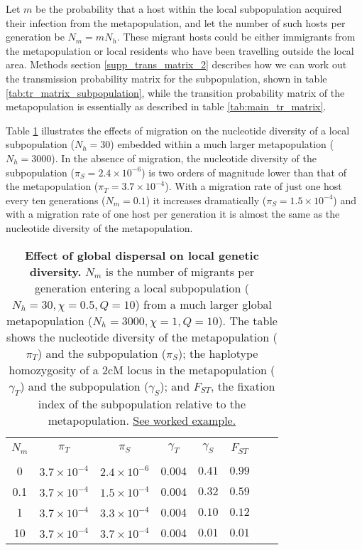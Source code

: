 \documentclass[_main.tex]{subfiles}
\begin{document}
Let $m$ be the probability that a host within the local subpopulation acquired their infection from the metapopulation, and let the number of such hosts per generation be $N_m = m N_h$.  These migrant hosts could be either immigrants from the metapopulation or local residents who have been travelling outside the local area.  Methods section \ref{supp_trans_matrix_2} describes how we can work out the transmission probability matrix for the subpopulation, shown in table \ref{tab:tr_matrix_subpopulation}, while the transition probability matrix of the metapopulation is essentially as described in table \ref{tab:main_tr_matrix}.   

Table \ref{table:main_global_dispersal_1} illustrates the effects of migration on the nucleotide diversity of a local subpopulation ($N_h = 30$) embedded within a much larger metapopulation ($N_h = 3000$).   In the absence of migration, the nucleotide diversity of the subpopulation ($\pi_S = 2.4 \times 10^{-6}$) is two orders of magnitude lower than that of the metapopulation ($\pi_T = 3.7 \times 10^{-4}$).   With a migration rate of just one host every ten generations ($N_m = 0.1$) it increases dramatically ($\pi_S = 1.5 \times 10^{-4}$) and with a migration rate of one host per generation it is almost the same as the nucleotide diversity of the metapopulation.  

 \begin{table}[h!] 
\centering
\small{
\begin{tabular}{c c c c c c c c} 
\hline \\
$N_m$ & $\pi_T$ & $\pi_S$ & $\gamma_T$ & $\gamma_S$ & $F_{ST}$ \\ [0.5ex] 
\hline \\
0 & $3.7 \times 10^{-4} $ & $2.4 \times 10^{-6}$ & 0.004 & $0.41$ & $0.99$ \\ [2ex]
0.1 & $3.7 \times 10^{-4} $ &  $1.5 \times 10^{-4}$ & 0.004 & $0.32$ & $0.59$ \\ [2ex]
1 & $3.7 \times 10^{-4} $ &  $3.3 \times 10^{-4}$ & 0.004 & $0.10$ & $0.12$ \\ [2ex]
10 & $3.7 \times 10^{-4} $ &  $3.7 \times 10^{-4}$ & 0.004 & $0.01$ & $0.01$ \\ [2ex]
\hline
\end{tabular}
}
\caption{\small{\textbf{Effect of global dispersal on local genetic diversity.}  $N_m$ is the number of migrants per generation entering a local subpopulation ($N_h = 30, \chi = 0.5, Q = 10$) from a much larger global metapopulation ($N_h = 3000, \chi = 1, Q = 10$).   The table shows the nucleotide diversity of the metapopulation ($\pi_T$) and the subpopulation ($\pi_S$); the haplotype homozygosity of a 2cM locus in the metapopulation ($\gamma_T$) and the subpopulation ($\gamma_S$); and $F_{ST}$, the fixation index of the subpopulation relative to the metapopulation.  \href{https://d-kwiat.github.io/gtg/migration-simple.html}{See worked example.}}}
\label{table:main_global_dispersal_1}
\end{table}
\end{document}

